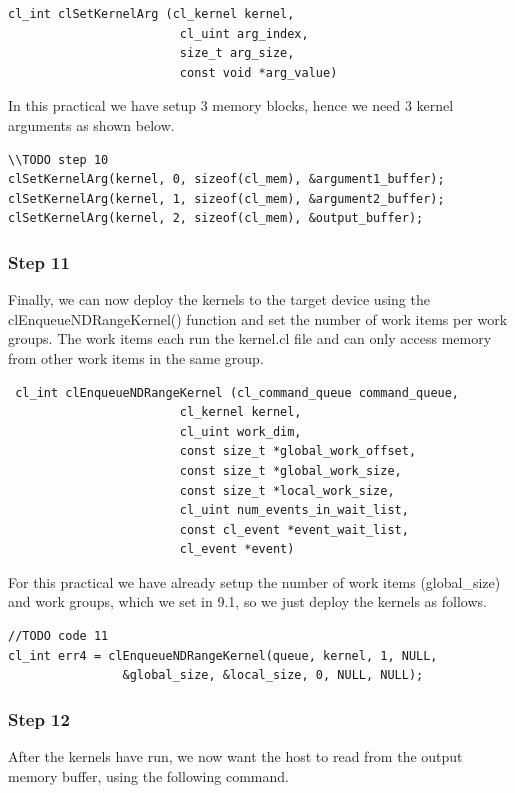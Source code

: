 \begin{lstlisting}
cl_int clSetKernelArg (cl_kernel kernel, 
                        cl_uint arg_index, 
                        size_t arg_size, 
                        const void *arg_value)
\end{lstlisting}

In this practical we have setup 3 memory blocks, hence we need 3 kernel arguments as shown below.

\begin{lstlisting}
\\TODO step 10
clSetKernelArg(kernel, 0, sizeof(cl_mem), &argument1_buffer);
clSetKernelArg(kernel, 1, sizeof(cl_mem), &argument2_buffer);
clSetKernelArg(kernel, 2, sizeof(cl_mem), &output_buffer);

\end{lstlisting}


\subsubsection{Step 11}
Finally, we can now deploy the kernels to the target device using the clEnqueueNDRangeKernel() function and set the number of work items per work groups. The work items each run the kernel.cl file and can only access memory from other work items in the same group.

\begin{lstlisting}
 cl_int clEnqueueNDRangeKernel (cl_command_queue command_queue, 
						cl_kernel kernel, 
						cl_uint work_dim, 
						const size_t *global_work_offset, 
						const size_t *global_work_size, 
					    const size_t *local_work_size, 
						cl_uint num_events_in_wait_list, 
						const cl_event *event_wait_list, 
						cl_event *event)
\end{lstlisting}

For this practical we have already setup the number of work items (global\_size) and work groups, which we set in 9.1, so we just deploy the kernels as follows.

\begin{lstlisting}
//TODO code 11
cl_int err4 = clEnqueueNDRangeKernel(queue, kernel, 1, NULL, 
                &global_size, &local_size, 0, NULL, NULL); 
\end{lstlisting}    

\subsubsection{Step 12}
After the kernels have run, we now want the host to read from the output memory buffer, using the following command.

